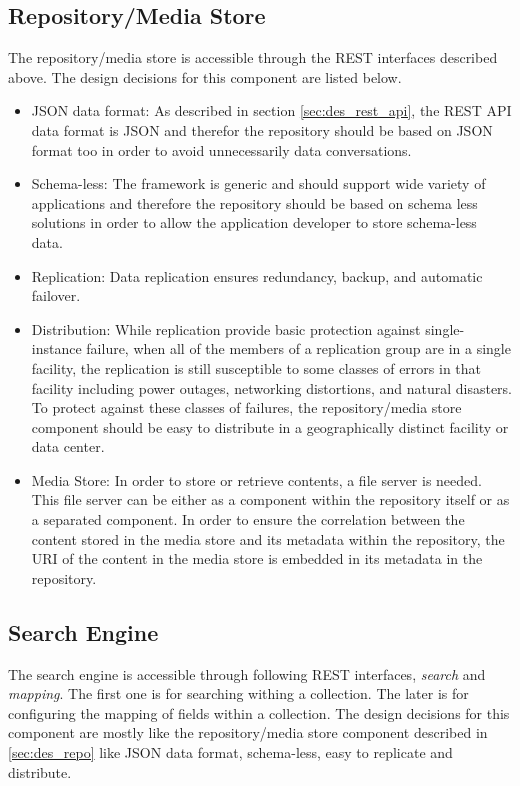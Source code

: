 \subsection{Repository/Media Store \label{sec:des_repo}}

The repository/media store is accessible through the REST interfaces described above. The design decisions for this component are listed below.

\begin{itemize}
\item {JSON data format:} As described in section \ref{sec:des_rest_api}, the REST API data format is JSON and therefor the repository should be based on JSON format too in order to avoid unnecessarily data conversations.

\item {Schema-less:} The framework is generic and should support wide variety of applications and therefore the repository should be based on schema less solutions in order to allow the application developer to store schema-less data.

\item {Replication:} Data replication ensures redundancy, backup, and automatic failover.

\item {Distribution:} While replication provide basic protection against single-instance failure, when all of the members of a replication group are in a single facility, the replication is still susceptible to some classes of errors in that facility including power outages, networking distortions, and natural disasters. To protect against these classes of failures, the repository/media store component should be easy to distribute in a geographically distinct facility or data center.

\item {Media Store:} In order to store or retrieve contents, a file server is needed. This file server can be either as a component within the repository itself or as a separated component. In order to ensure the correlation between the content stored in the media store and its metadata within the repository, the URI of the content in the media store is embedded in its metadata in the repository.
\end{itemize}
 
\subsection{Search Engine\label{sec:des_se_en}}
The search engine is accessible through following REST interfaces, \textit{search} and \textit{mapping}. The first one is for searching withing a collection. The later is for configuring the mapping of fields within a collection. The design decisions for this component are mostly like the repository/media store component described in \ref{sec:des_repo} like JSON data format, schema-less, easy to replicate and distribute.%

